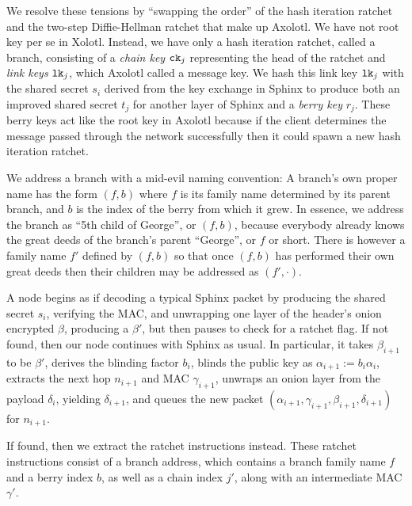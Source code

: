 \documentclass[twoside,letterpaper]{llncs}
\begin{document}
We resolve these tensions by ``swapping the order'' of the hash
iteration ratchet and the two-step Diffie-Hellman ratchet that make
up Axolotl.   
%
We have not root key per se in Xolotl.  
Instead, we have only a hash iteration ratchet, called a branch,
consisting of a {\it chain key} $\texttt{ck}_j$ representing the head of the
ratchet and {\it link keys} $\texttt{lk}_j$, which Axolotl called a message
key.  We hash this link key $\texttt{lk}_j$ with the shared secret $s_i$
derived from the key exchange in Sphinx to produce both an improved
shared secret $t_j$ for another layer of Sphinx and a {\it berry key} $r_j$. 
These berry keys act like the root key in Axolotl because if the
client determines the message passed through the network successfully
then it could spawn a new hash iteration ratchet.

We address a branch with a mid-evil naming convention: 
A branch's own proper name has the form $(f,b)$ where
 $f$ is its family name determined by its parent branch, and
 $b$ is the index of the berry from which it grew.
In essence, we address the branch as ``5th child of George'',
or $(f,b)$, because everybody already knows the great deeds
of the branch's parent ``George'', or $f$ or short. 
There is however a family name $f'$ defined by $(f,b)$ so that
once $(f,b)$ has performed their own great deeds then their
children may be addressed as $(f',\cdot)$.

\smallskip {} 

A node begins as if decoding a typical Sphinx packet by
 producing the shared secret $s_i$, verifying the MAC, and 
 unwrapping one layer of the header's onion encrypted $\beta$,
producing a $\beta'$,
but then pauses to check for a ratchet flag. 
If not found, then our node continues with Sphinx as usual.
In particular, it takes $\beta_{i+1}$ to be $\beta'$,
derives the blinding factor $b_i$,
blinds the public key as $\alpha_{i+1} := b_i \alpha_i$,
extracts the next hop $n_{i+1}$ and MAC $\gamma_{i+1}$,
unwraps an onion layer from the payload $\delta_i$,
 yielding $\delta_{i+1}$, and queues the new packet
$(\alpha_{i+1},\gamma_{i+1},\beta_{i+1},\delta_{i+1})$ for $n_{i+1}$.

If found, then we extract the ratchet instructions instead.
These ratchet instructions consist of a branch address,
which contains a branch family name $f$ and a berry index $b$,
 as well as a chain index $j'$,
along with an intermediate MAC $\gamma'$.
\end{document}
